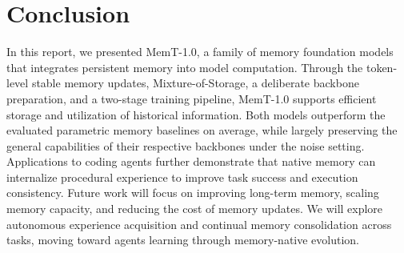 \section{Conclusion}

In this report, we presented MemT-1.0, a family of memory foundation models that integrates persistent memory into model computation.
Through the token-level stable memory updates, Mixture-of-Storage, a deliberate backbone preparation, and a two-stage training pipeline, MemT-1.0 supports efficient storage and utilization of historical information.
Both models outperform the evaluated parametric memory baselines on average, while largely preserving the general capabilities of their respective backbones under the noise setting.
Applications to coding agents further demonstrate that native memory can internalize procedural experience to improve task success and execution consistency.
Future work will focus on improving long-term memory, scaling memory capacity, and reducing the cost of memory updates.
We will explore autonomous experience acquisition and continual memory consolidation across tasks, moving toward agents learning through memory-native evolution.